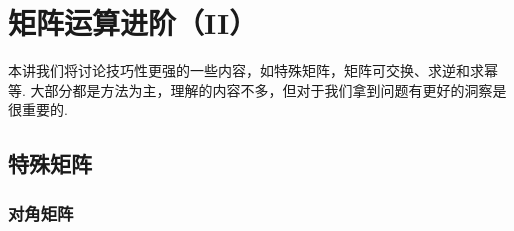 \chapter{矩阵运算进阶（II）} \label{chap:矩阵运算进阶（II）}

本讲我们将讨论技巧性更强的一些内容，如特殊矩阵，矩阵可交换、求逆和求幂等. 大部分都是方法为主，理解的内容不多，但对于我们拿到问题有更好的洞察是很重要的.

\section{特殊矩阵}

\subsection{对角矩阵}

